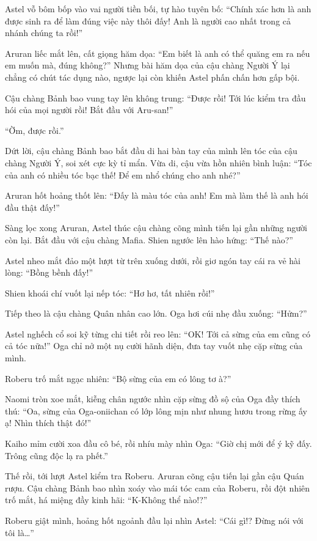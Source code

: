 \documentclass[../main.tex]{subfiles}
\begin{document}
Astel vỗ bôm bốp vào vai người tiền bối, tự hào tuyên bố: ``Chính xác hơn là anh được sinh ra để làm đúng việc này thôi đấy! Anh là người cao nhất trong cả nhánh chúng ta rồi!''

Aruran liếc mắt lên, cất giọng hăm dọa: ``Em biết là anh có thể quăng em ra nếu em muốn mà, đúng không?'' Nhưng bài hăm dọa của cậu chàng Người Ý lại chẳng có chút tác dụng nào, ngược lại còn khiến Astel phấn chấn hơn gấp bội.

Cậu chàng Bảnh bao vung tay lên không trung: ``Được rồi! Tới lúc kiểm tra đầu hói của mọi người rồi! Bắt đầu với Aru-san!''

``Ờm, được rồi.''

Dứt lời, cậu chàng Bảnh bao bắt đầu di hai bàn tay của mình lên tóc của cậu chàng Người Ý, soi xét cực kỳ tỉ mẩn. Vừa di, cậu vừa hồn nhiên bình luận: ``Tóc của anh có nhiều tóc bạc thế! Để em nhổ chúng cho anh nhé?''

Aruran hốt hoảng thốt lên: ``Đấy là màu tóc của anh! Em mà làm thế là anh hói đầu thật đấy!''

Sàng lọc xong Aruran, Astel thúc cậu chàng cõng mình tiến lại gần những người còn lại. Bắt đầu với cậu chàng Mafia. Shien ngước lên hào hứng: ``Thế nào?''

Astel nheo mắt đảo một lượt từ trên xuống dưới, rồi giơ ngón tay cái ra vẻ hài lòng: ``Bồng bềnh đấy!''

Shien khoái chí vuốt lại nếp tóc: ``Hơ hơ, tất nhiên rồi!''

Tiếp theo là cậu chàng Quân nhân cao lớn. Oga hơi cúi nhẹ đầu xuống: ``Hửm?''

Astel nghếch cổ soi kỹ từng chi tiết rồi reo lên: ``OK! Tới cả sừng của em cũng có cả tóc nữa!'' Oga chỉ nở một nụ cười hãnh diện, đưa tay vuốt nhẹ cặp sừng của mình.

Roberu trố mắt ngạc nhiên: ``Bộ sừng của em có lông tơ à?''

Naomi tròn xoe mắt, kiễng chân ngước nhìn cặp sừng đồ sộ của Oga đầy thích thú: ``Oa, sừng của Oga-oniichan có lớp lông mịn như nhung hươu trong rừng ấy ạ! Nhìn thích thật đó!''

Kaiho mỉm cười xoa đầu cô bé, rồi nhíu mày nhìn Oga: ``Giờ chị mới để ý kỹ đấy. Trông cũng độc lạ ra phết.''

Thế rồi, tới lượt Astel kiểm tra Roberu. Aruran cõng cậu tiến lại gần cậu Quán rượu. Cậu chàng Bảnh bao nhìn xoáy vào mái tóc cam của Roberu, rồi đột nhiên trố mắt, há miệng đầy kinh hãi: ``K-Không thể nào!?''

Roberu giật mình, hoảng hốt ngoảnh đầu lại nhìn Astel: ``Cái gì!? Đừng nói với tôi là\dots''
\end{document}

